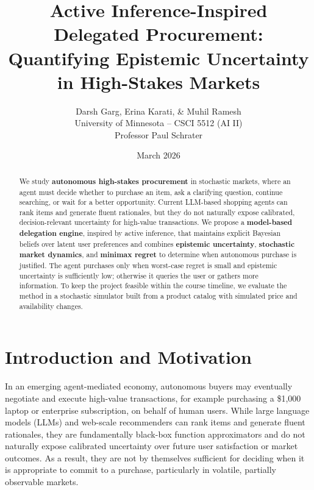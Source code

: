 \documentclass[11pt]{article}
\title{Active Inference-Inspired Delegated Procurement: Quantifying Epistemic Uncertainty in High-Stakes Markets}
\author{Darsh Garg, Erina Karati, \& Muhil Ramesh\\University of Minnesota -- CSCI 5512 (AI II)\\Professor Paul Schrater}
\date{March 2026}
\begin{document}
\maketitle

\begin{abstract}
We study \textbf{autonomous high-stakes procurement} in stochastic markets, where an agent must decide whether to purchase an item, ask a clarifying question, continue searching, or wait for a better opportunity. Current LLM-based shopping agents can rank items and generate fluent rationales, but they do not naturally expose calibrated, decision-relevant uncertainty for high-value transactions. We propose a \textbf{model-based delegation engine}, inspired by active inference, that maintains explicit Bayesian beliefs over latent user preferences and combines \textbf{epistemic uncertainty}, \textbf{stochastic market dynamics}, and \textbf{minimax regret} to determine when autonomous purchase is justified. The agent purchases only when worst-case regret is small and epistemic uncertainty is sufficiently low; otherwise it queries the user or gathers more information. To keep the project feasible within the course timeline, we evaluate the method in a stochastic simulator built from a product catalog with simulated price and availability changes.
\end{abstract}

\section{Introduction and Motivation}

In an emerging agent-mediated economy, autonomous buyers may eventually negotiate and execute high-value transactions, for example purchasing a \$1{,}000 laptop or enterprise subscription, on behalf of human users. While large language models (LLMs) and web-scale recommenders can rank items and generate fluent rationales, they are fundamentally black-box function approximators and do not naturally expose calibrated uncertainty over future user satisfaction or market outcomes.\cite{charpentier2022disentangling} As a result, they are not by themselves sufficient for deciding when it is appropriate to commit to a purchase, particularly in volatile, partially observable markets.
\end{document}
